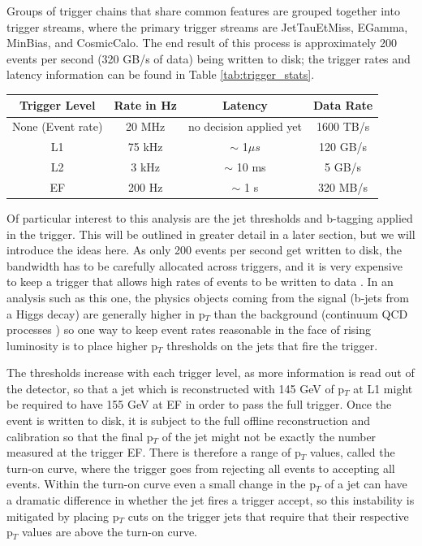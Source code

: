 Groups of trigger chains that share common features are grouped together into trigger streams, where the primary trigger streams 
are JetTauEtMiss, EGamma, MinBias, and CosmicCalo.  The end result of this process is approximately 200 events 
per second (320 GB/s of data) being written to disk; the trigger rates and latency 
information can be found in Table \ref{tab:trigger_stats}.

  

\begin{table}
\begin{tabular}{c | c | c | c}
Trigger Level & Rate in Hz  & Latency  & Data Rate\\  \hline
None (Event rate) & 20 MHz  & no decision applied yet & 1600 TB/s \\
L1  & 75 kHz  &  $\sim$ 1$\mu s$  & 120 GB/s\\
L2  & 3 kHz    & $\sim$ 10 ms & 5 GB/s \\
EF  &  200 Hz  & $\sim$ 1 s & 320 MB/s \\
\end{tabular}
\end{table}
\label{tab:trigger_stats}


Of particular interest to this analysis are the jet thresholds and b-tagging applied in the trigger.  This 
will be outlined in greater detail in a later section, but we will introduce the ideas here.  As 
only 200 events per second get written to disk, the bandwidth has to be carefully allocated across triggers, 
and it is very expensive to keep a trigger that allows high rates of events to be written to data
.  In an analysis such as this one, the physics objects coming from the signal (b-jets 
from a Higgs decay) are generally higher in p$_T$ than the background (continuum QCD processes
) so one way to keep event rates reasonable in the face of rising luminosity is to place higher p$_T$ 
thresholds on the jets that fire the trigger.   

The thresholds increase with each trigger level, as more information is read out of the detector, so that 
a jet which is reconstructed with 145 GeV of p$_T$ at L1 
might be required to have 155 GeV at EF in order to pass the full trigger.  Once the event 
is written to disk, it is subject to the full offline reconstruction and calibration so that the final p$_T$ 
of the jet might not be exactly the number measured at the trigger EF.  There is therefore a range 
of p$_T$ values, called the turn-on curve, where the trigger goes from rejecting 
all events to accepting all events.  Within the turn-on curve even a small change in the p$_T$
of a jet can have a dramatic difference in whether the jet fires a trigger accept, so this 
instability is mitigated by placing p$_T$ cuts on the trigger jets that require that their respective p$_T$ 
values are above the turn-on curve.  

